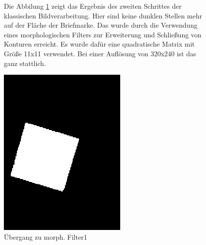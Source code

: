 \documentclass[12pt,toc=bib,toc=listof]{scrreprt}
\begin{document}
\begin{figure}[h]
\begin{minipage}[t]{.75\linewidth}

Die Abbilung \ref{fig:bv_morph1} zeigt das Ergebnis des zweiten Schrittes der klassischen Bildverarbeitung. Hier sind keine dunklen Stellen mehr auf der Fläche der Briefmarke. Das wurde durch die Verwendung eines morphologischen Filters zur Erweiterung und Schließung von Konturen erreicht. Es wurde dafür eine quadratische Matrix mit Größe 11x11 verwendet. Bei einer Auflösung von 320x240 ist das ganz stattlich.
\end{minipage}
\hfill
\begin{minipage}[t]{.2\linewidth}
\strut\vspace*{-\baselineskip}
\newline
  \includegraphics[width=\linewidth]{./../bilder/bin1morph}
  \caption{Übergang zu morph. Filter1}
  \label{fig:bv_morph1}
\end{minipage}
\end{figure}
\end{document}
